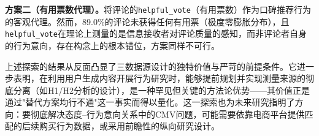 \textbf{方案二（有用票数代理）。}将评论的\texttt{helpful\_vote}（有用票数）作为口碑推荐行为的客观代理。然而，89.0\%的评论未获得任何有用票（极度零膨胀分布），且\texttt{helpful\_vote}在理论上测量的是信息接收者对评论质量的感知，而非评论者自身的行为意向，存在构念上的根本错位，方案同样不可行。

上述探索的结果从反面凸显了三数据源设计的独特价值与严苛的前提条件。它进一步表明，在利用用户生成内容开展行为研究时，能够提前规划并实现测量来源的彻底分离（如H1/H2分析的设计），是一种罕见但关键的方法论优势——其价值正是通过"替代方案均行不通"这一事实而得以量化。这一探索也为未来研究指明了方向：要彻底解决态度--行为意向关系中的CMV问题，可能需要依靠电商平台提供匹配的后续购买行为数据，或采用前瞻性的纵向研究设计。

